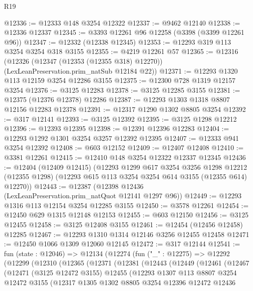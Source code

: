 \begin{lexlean}{R19}
\begin{coremodule}
@12336 := @12333 @148 @3254 @12322
@12337 := @9462 @12140
@12338 := @12336 @12337
@12345 := @3393 @12261 @96 @12258 (@3398 (@3399 @12261 @96))
@12347 := @12332 (@12338 @12345)
@12353 := @12293 @319 @113 @3254 @3254 @318 @3155
@12355 := @4219 @12261 @57
@12365 := @12316
    (@12326 (@12347 (@12353 (@12355 @318) @12270)) (LexLeanPreservation.prim_natSub @12184 @22))
@12371 := @12293 @1320 @113 @12159 @3254 @12286 @3155
@12375 := @12300 @728 @1319 @12157 @3254
@12376 := @3125 @12283
@12378 := @3125 @12285 @3155
@12381 := @12375 (@12376 @12378) @12286
@12387 := @12293 @1303 @1318 @8807 @12156 @12283 @12378
@12391 := @12317 @1290 @1302 @8805 @3254
@12392 := @317 @12141
@12393 := @3125 @12392
@12395 := @3125 @1298 @12212
@12396 := @12393 @12395
@12398 := @12391 @12396 @12283
@12404 := @12293 @1292 @1301 @3254 @3257 @12392 @12395
@12407 := @12333 @941 @3254 @12392
@12408 := @603 @12152
@12409 := @12407 @12408
@12410 := @3381 @12261
@12415 := @12410 @148 @3254 @12322 @12337 @12345
@12436 := @12404
    (@12409 @12415)
    (@12293
      @1299
      @617
      @3254
      @3256
      @1298
      @12212
      (@12355 @1298)
      (@12293 @615 @113 @3254 @3254 @614 @3155 (@12355 @614) @12270))
@12443 := @12387 (@12398 @12436 (LexLeanPreservation.prim_natQuot @12141 @1297 @96))
@12449 := @12293 @1316 @113 @12154 @3254 @12285 @3155
@12450 := @3578 @12261
@12454 := @12450 @629 @1315 @12148 @12153
@12455 := @603 @12150
@12456 := @3125 @12455
@12458 := @3125 @12408 @3155
@12461 := @12454 (@12456 @12458) @12285
@12467 := @12293 @1310 @1314 @12146 @3256 @12455 @12458
@12471 := @12450 @1066 @1309 @12060 @12145
@12472 := @317 @12144
@12541 := fun (state : @12046) =>
  @12134
    (@12274
      (fun ("_" : @12275) =>
      @12292
        (@12299
          (@12310
            (@12365
              (@12371
                (@12381
                  (@12443
                    (@12449
                      (@12461
                        (@12467
                          (@12471
                            (@3125 @12472 @3155)
                            @12455
                            (@12293
                              @1307
                              @113
                              @8807
                              @3254
                              @12472
                              @3155
                              (@12317
                                @1305
                                @1302
                                @8805
                                @3254
                                @12396
                                @12472
                                @12436

\end{coremodule}
\end{lexlean}
